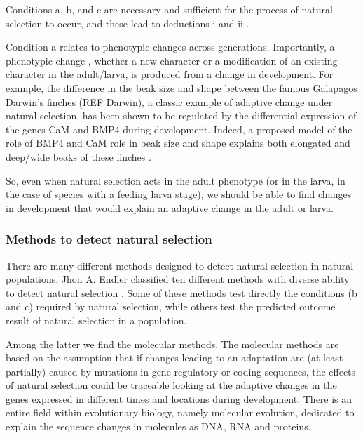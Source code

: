 Conditions a, b, and c are necessary and sufficient for the process of natural selection to occur, and these lead to deductions i and ii \citep{endler1986natural}.

Condition a relates to phenotypic changes across generations. Importantly, a phenotypic change , whether a new character or a modification of an existing character in the adult/larva, is produced from a change in development.
For example, the difference in the beak size and shape between the famous Galapagos Darwin's finches (REF Darwin), a classic example of adaptive change under natural selection, has been shown to be regulated by the differential expression of the genes CaM 
and BMP4 
during development. Indeed, a proposed model of the role of BMP4 and CaM role in beak size and shape explains both elongated and deep/wide beaks of these finches
	\citep{Abzhanov2006}.

So, even when natural selection acts in the adult phenotype (or in the larva, in the case of species with a feeding larva stage), we should be able to find changes in development that would explain an adaptive change in the adult or larva.

\subsubsection{Methods to detect natural selection}

There are many different methods designed to detect natural selection in natural populations. Jhon A. Endler classified ten different methods with diverse ability to detect natural selection \citep{endler1986natural}. Some of these methods test directly the conditions (b and c) required by natural selection, while others test the predicted outcome result of natural selection in a population.

Among the latter we find the molecular methods. The molecular methods are based on the assumption that if changes leading to an adaptation are (at least partially) caused by mutations in gene regulatory or coding sequences, the effects of natural selection could be traceable looking at the adaptive changes in the genes expressed in different times and locations during development. There is an entire field within evolutionary biology, namely molecular evolution, dedicated to explain the sequence changes in molecules as DNA,
RNA 
and proteins. 

